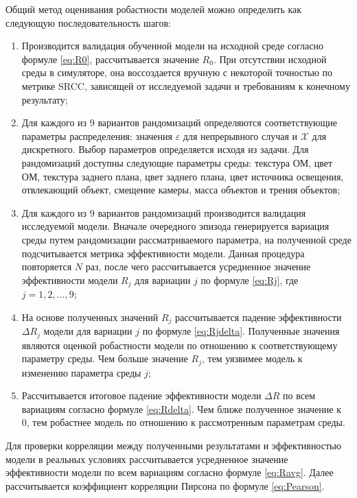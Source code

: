         Общий метод оценивания робастности моделей можно определить как следующую последовательность шагов:

        \begin{enumerate}
            \item Производится валидация обученной модели на исходной среде согласно формуле \ref{eq:R0}, рассчитывается значение $R_0$. При отсутствии исходной среды в симуляторе, она воссоздается вручную с некоторой точностью по метрике SRCC, зависящей от исследуемой задачи и требованиям к конечному результату;    
            \item Для каждого из 9 вариантов рандомизаций определяются соответствующие параметры распределения: значения $\varepsilon$ для непрерывного случая и $\mathcal{X}$ для дискретного. Выбор параметров определяется исходя из задачи. Для рандомизаций доступны следующие параметры среды: текстура ОМ, цвет ОМ, текстура заднего плана, цвет заднего плана, цвет источника освещения, отвлекающий объект, смещение камеры, масса объектов и трения объектов;
            \item Для каждого из 9 вариантов рандомизаций производится валидация исследуемой модели. Вначале очередного эпизода генерируется вариация среды путем рандомизации рассматриваемого параметра, на полученной среде подсчитывается метрика эффективности модели. Данная процедура повторяется $N$ раз, после чего рассчитывается усредненное значение эффективности модели $R_j$ для вариации $j$ по формуле \ref{eq:Rj}, где $j = 1, 2, \dots, 9$;
            \item На основе полученных значений $R_j$ рассчитывается падение эффективности $\Delta R_j$ модели для вариации $j$ по формуле \ref{eq:Rjdelta}. Полученные значения являются оценкой робастности модели по отношению к соответствующему параметру среды. Чем больше значение $R_j$, тем уязвимее модель к изменению параметра среды $j$;
            \item Рассчитывается итоговое падение эффективности модели $\Delta R$ по всем вариациям согласно формуле \ref{eq:Rdelta}. Чем ближе полученное значение к 0, тем робастнее модель по отношению к рассмотренным параметрам среды.
        \end{enumerate}
    
        Для проверки корреляции между полученными результатами и эффективностью модели в реальных условиях рассчитывается усредненное значение эффективности модели по всем вариациям согласно формуле \ref{eq:Ravg}. Далее рассчитывается коэффициент корреляции Пирсона по формуле \ref{eq:Pearson}. 


